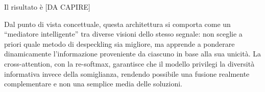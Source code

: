 Il risultato è [DA CAPIRE] 

Dal punto di vista concettuale, questa architettura si comporta come un “mediatore intelligente” tra diverse visioni dello stesso segnale: non 
sceglie a priori quale metodo di despeckling sia migliore, ma apprende a ponderare dinamicamente l’informazione proveniente da ciascuno in base 
alla sua unicità. La cross-attention, con la re-softmax, garantisce che il modello privilegi la diversità informativa invece della somiglianza, 
rendendo possibile una fusione realmente complementare e non una semplice media delle soluzioni.
